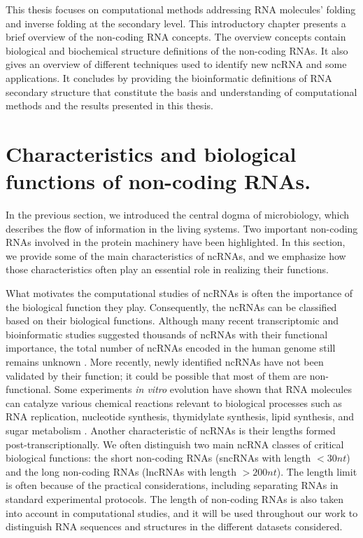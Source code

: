 This thesis focuses on computational methods addressing RNA molecules' folding and inverse folding at the secondary level. This introductory chapter presents a brief overview of the non-coding RNA concepts. The overview concepts contain biological and biochemical structure definitions of the non-coding RNAs. It also gives an overview of different techniques used to identify new ncRNA and some applications. It concludes by providing the bioinformatic definitions of RNA secondary structure that constitute the basis and understanding of computational methods and the results presented in this thesis.




\section{Characteristics and biological functions of  non-coding RNAs.} 
In the previous section, we introduced the central dogma of microbiology, which describes the flow of information in the living systems. Two important non-coding RNAs involved in the protein machinery have been highlighted. In this section, we provide some of the main characteristics of ncRNAs, and we emphasize how those characteristics often play an essential role in realizing their functions. 

What motivates the computational studies of ncRNAs is often the importance of the biological function they play. Consequently, the ncRNAs can be classified based on their biological functions. Although many recent transcriptomic and bioinformatic studies suggested thousands of ncRNAs with their functional importance, the total number of ncRNAs encoded in the human genome still remains unknown \cite{santosh2015non}. More recently, newly identified ncRNAs have not been validated by their function; it could be possible that most of them are non-functional. Some experiments \textit{in vitro} evolution have shown that RNA molecules can catalyze various chemical reactions relevant to biological processes such as RNA replication, nucleotide synthesis, thymidylate synthesis, lipid synthesis, and sugar metabolism \cite{robertson1990selection,ellington2009evolutionary}. 
Another characteristic of ncRNAs is their lengths formed post-transcriptionally. We often distinguish two main ncRNA classes of critical biological functions: the short non-coding RNAs (sncRNAs with length $<30nt$) and the long non-coding RNAs (lncRNAs with length $>200nt$). The length limit is often because of the practical considerations, including separating RNAs in standard experimental protocols. The length of non-coding RNAs is also taken into account in computational studies, and it will be used throughout our work to distinguish RNA sequences and structures in the different datasets considered.

